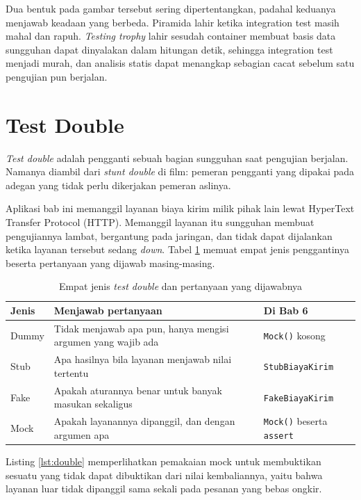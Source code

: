 Dua bentuk pada gambar tersebut sering dipertentangkan, padahal keduanya
menjawab keadaan yang berbeda. Piramida \cite{cohn2009succeeding} lahir
ketika integration test masih mahal dan rapuh. \textit{Testing trophy}
\cite{dodds-trophy} lahir sesudah container membuat basis data sungguhan
dapat dinyalakan dalam hitungan detik, sehingga integration test menjadi
murah, dan analisis statis dapat menangkap sebagian cacat sebelum satu
pengujian pun berjalan.

\section{Test Double}

\textit{Test double} adalah pengganti sebuah bagian sungguhan saat pengujian
berjalan. Namanya diambil dari \textit{stunt double} di film: pemeran
pengganti yang dipakai pada adegan yang tidak perlu dikerjakan pemeran
aslinya.

Aplikasi bab ini memanggil layanan biaya kirim milik pihak lain lewat HyperText Transfer Protocol (HTTP).
Memanggil layanan itu sungguhan membuat pengujiannya lambat, bergantung pada
jaringan, dan tidak dapat dijalankan ketika layanan tersebut sedang
\textit{down}. Tabel \ref{tab:double} memuat empat jenis penggantinya beserta
pertanyaan yang dijawab masing-masing.

\begin{table}[!htb]
  \centering
  \caption{Empat jenis \textit{test double} dan pertanyaan yang dijawabnya}
  \label{tab:double}
  \begin{tabularx}{\textwidth}{lXl}
    \hline
    \textbf{Jenis} & \textbf{Menjawab pertanyaan} & \textbf{Di Bab 6} \\
    \hline
    Dummy & Tidak menjawab apa pun, hanya mengisi argumen yang wajib ada & \texttt{Mock()} kosong \\
    \hline
    Stub & Apa hasilnya bila layanan menjawab nilai tertentu & \texttt{StubBiayaKirim} \\
    \hline
    Fake & Apakah aturannya benar untuk banyak masukan sekaligus & \texttt{FakeBiayaKirim} \\
    \hline
    Mock & Apakah layanannya dipanggil, dan dengan argumen apa & \texttt{Mock()} beserta \texttt{assert} \\
    \hline
  \end{tabularx}
\end{table}

Listing \ref{lst:double} memperlihatkan pemakaian mock untuk membuktikan
sesuatu yang tidak dapat dibuktikan dari nilai kembaliannya, yaitu bahwa
layanan luar tidak dipanggil sama sekali pada pesanan yang bebas ongkir.

